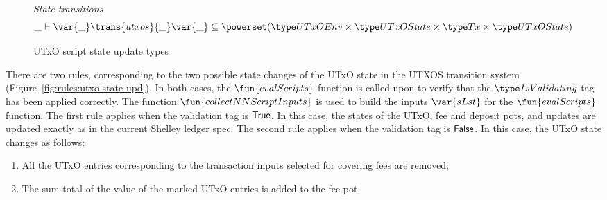 \begin{figure}[htb]
  \emph{State transitions}
  \begin{equation*}
    \_ \vdash
    \var{\_} \trans{utxos}{\_} \var{\_}
    \subseteq \powerset (\UTxOEnv \times \UTxOState \times \Tx \times \UTxOState)
  \end{equation*}
  \caption{UTxO script state update types}
  \label{fig:ts-types:utxo-scripts}
\end{figure}

There are two rules, corresponding to the two possible state changes of the
UTxO state in the UTXOS transition system (Figure~\ref{fig:rules:utxo-state-upd}).
%
In both cases, the $\fun{evalScripts}$ function is called upon to verify that the $\IsValidating$
tag has been applied correctly. The function $\fun{collectNNScriptInputs}$ is used to build
the inputs $\var{sLst}$ for the $\fun{evalScripts}$ function.
%
The first rule
applies when the validation tag is $\mathsf{True}$.
In this case, the states of the UTxO, fee
  and deposit pots, and updates are updated exactly as in the current Shelley
  ledger spec.
%
  The second rule
  applies when the validation tag is $\mathsf{False}$.
  In this case, the UTxO state changes as follows:

  \begin{enumerate}
    \item All the
    UTxO entries corresponding to the transaction inputs selected for covering
    fees are removed;

    \item The sum total of the value of the marked UTxO entries
    is added to the fee pot.
  \end{enumerate}


